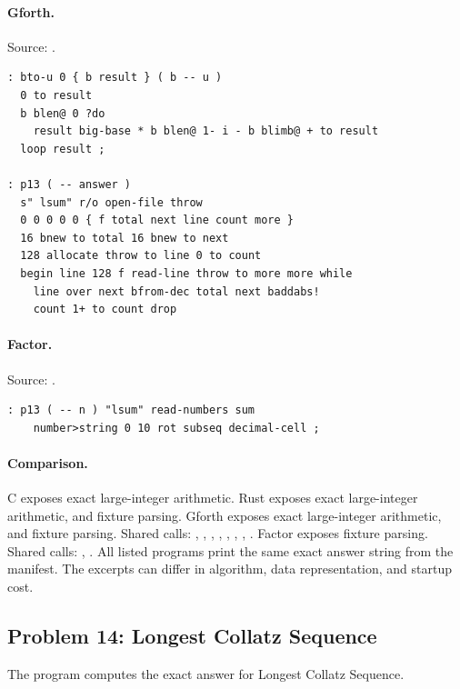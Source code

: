 \paragraph{Gforth.} Source: .
\begin{lstlisting}
: bto-u 0 { b result } ( b -- u )
  0 to result
  b blen@ 0 ?do
    result big-base * b blen@ 1- i - b blimb@ + to result
  loop result ;

: p13 ( -- answer )
  s" lsum" r/o open-file throw
  0 0 0 0 0 { f total next line count more }
  16 bnew to total 16 bnew to next
  128 allocate throw to line 0 to count
  begin line 128 f read-line throw to more more while
    line over next bfrom-dec total next baddabs!
    count 1+ to count drop
\end{lstlisting}

\paragraph{Factor.} Source: .
\begin{lstlisting}
: p13 ( -- n ) "lsum" read-numbers sum
    number>string 0 10 rot subseq decimal-cell ;
\end{lstlisting}

\paragraph{Comparison.}
C exposes exact large-integer arithmetic. Rust exposes exact large-integer arithmetic, and fixture parsing. Gforth exposes exact large-integer arithmetic, and fixture parsing. Shared calls: \texttt{}, \texttt{}, \texttt{}, \texttt{}, \texttt{}, \texttt{}, \texttt{}, \texttt{}. Factor exposes fixture parsing. Shared calls: \texttt{}, \texttt{}.
All listed programs print the same exact answer string from the manifest. The excerpts can differ in algorithm, data representation, and startup cost.

\subsection{Problem 14: Longest Collatz Sequence}
\label{walkthrough:p14}
The program computes the exact answer for Longest Collatz Sequence.

